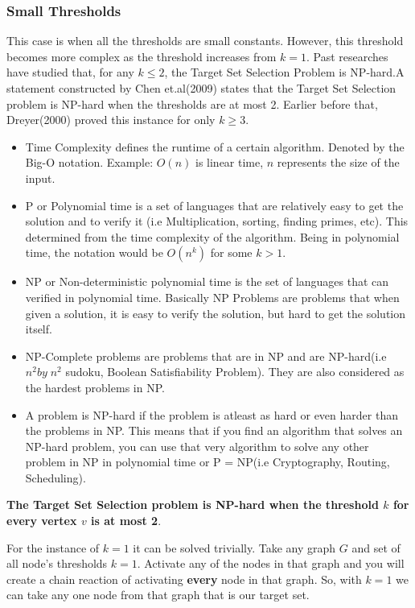 \subsubsection{Small Thresholds}
This case is when all the thresholds are small constants. However, this threshold becomes more complex as the threshold increases from $k=1$. Past researches have studied that, for any $k \leq 2$, the Target Set Selection Problem is NP-hard.A statement constructed by Chen et.al(2009) states that the Target Set Selection problem is NP-hard when the thresholds are at most 2. Earlier before that, Dreyer(2000) proved this instance for only $k \geq 3$.\cite{dreyer} \cite{NPhardness} 
\begin{itemize}
	\item Time Complexity defines the runtime of a certain algorithm. Denoted by the Big-O notation. Example: $O(n)$ is linear time, $n$ represents the size of the input.
	\item P or Polynomial time is a set of languages that are relatively easy to get the solution and to verify it (i.e Multiplication, sorting, finding primes, etc). This determined from the time complexity of the algorithm. Being in polynomial time, the notation would be $O(n^k)$ for some $k>1$.
	\item NP or Non-deterministic polynomial time is the set of languages that can verified in polynomial time. Basically NP Problems are problems that when given a solution, it is easy to verify the solution, but hard to get the solution itself.
	\item NP-Complete problems are problems that are in NP and are NP-hard(i.e $n^{2}by\; n^{2}$ sudoku, Boolean Satisfiability Problem). They are also considered as the hardest problems in NP.
	\item A problem is NP-hard if the problem is atleast as hard or even harder than the problems in NP. This means that if you find an algorithm that solves an NP-hard problem, you can use that very algorithm to solve any other problem in NP in polynomial time or P = NP(i.e Cryptography, Routing, Scheduling).  
\end{itemize} 
\textbf{The Target Set Selection problem is NP-hard when the threshold $k$ for every vertex $v$ is at most 2}. \cite{chen,dreyer}

For the instance of $k=1$ it can be solved trivially. Take any graph $G$ and set of all node's thresholds $k=1$. Activate any of the nodes in that graph and you will create a chain reaction of activating \textbf{every} node in that graph. So, with $k=1$ we can take any one node from that graph that is our target set.\cite{chen}
